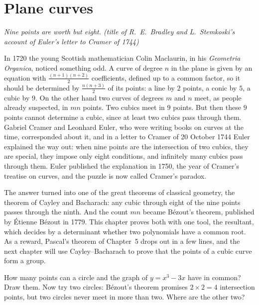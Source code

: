 \chapter{Plane curves}\label{ch:curves}

\begin{center}\itshape
Nine points are worth but eight.
\upshape(title of R.~E.~Bradley and L.~Stemkoski's account of Euler's letter to Cramer of 1744)
\end{center}

In 1720 the young Scottish mathematician Colin Maclaurin, in his \emph{Geometria Organica}, noticed something odd. A curve of degree $n$ in the plane is given by an equation with
$\frac{(n+1)(n+2)}2$ coefficients, defined up to a common factor, so it should be determined by $\frac{n(n+3)}2$ of its points: a line by $2$ points,
a conic by $5$, a cubic by $9$. On the other hand two curves of degrees $m$ and $n$ meet, as people already suspected, in $mn$ points. Two cubics meet in
$9$ points. But then these $9$ points cannot determine a cubic, since at least two cubics pass through them. Gabriel Cramer and Leonhard Euler,
who were writing books on curves at the time, corresponded about it, and in a letter to Cramer of 20 October 1744 Euler explained the way out: when nine
points are the intersection of two cubics, they are special, they impose only eight conditions, and infinitely many cubics pass through them. Euler
published the explanation in 1750, the year of Cramer's treatise on curves, and the puzzle is now called Cramer's paradox.

The answer turned into one of the great theorems of classical geometry, the theorem of Cayley and Bacharach: any cubic through eight of the nine
points passes through the ninth. And the count $mn$ became Bézout's theorem, published by \'Etienne B\'ezout in 1779. This chapter proves both with one
tool, the resultant, which decides by a determinant whether two polynomials have a common root. As a reward, Pascal's theorem of Chapter~5 drops out
in a few lines, and the next chapter will use Cayley--Bacharach to prove that the points of a cubic curve form a group.

\begin{think}
How many points can a circle and the graph of $y=x^3-3x$ have in common? Draw them. Now try two circles: Bézout's theorem promises $2\times2=4$
intersection points, but two circles never meet in more than two. Where are the other two?
\end{think}

